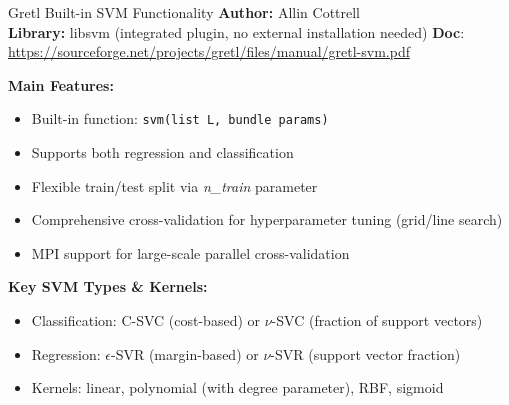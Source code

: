 \documentclass[11pt]{beamer}
\begin{document}
\begin{frame}{Gretl Built-in SVM Functionality}
	\small
    \textbf{Author:} Allin Cottrell \\
  \textbf{Library:} libsvm (integrated plugin, no external installation needed)
  \textbf{Doc}: \url{https://sourceforge.net/projects/gretl/files/manual/gretl-svm.pdf}
  \vspace{0.1cm}

  \textbf{Main Features:}
  \begin{itemize}
    \item Built-in function: \texttt{svm(list L, bundle params)}
    \item Supports both regression and classification
    \item Flexible train/test split via \textit{n\_train} parameter
    \item Comprehensive cross-validation for hyperparameter tuning (grid/line search)
    \item MPI support for large-scale parallel cross-validation
  \end{itemize}

  \vspace{0.1cm}

  \textbf{Key SVM Types \& Kernels:}
  \begin{itemize}
    \item Classification: C-SVC (cost-based) or \textit{$\nu$}-SVC (fraction of support vectors)
    \item Regression: \textit{$\epsilon$}-SVR (margin-based) or \textit{$\nu$}-SVR (support vector fraction)
    \item Kernels: linear, polynomial (with degree parameter), RBF, sigmoid
  \end{itemize}
\end{frame}
\end{document}
